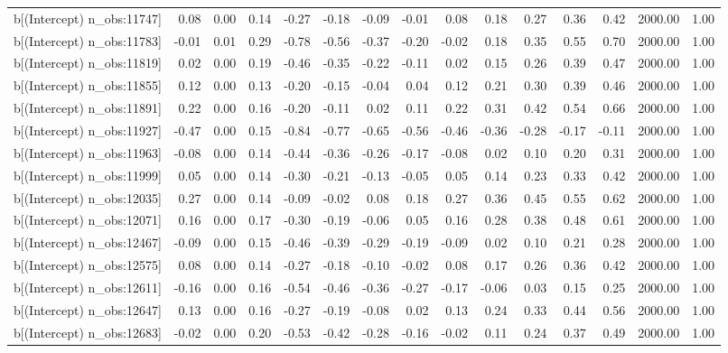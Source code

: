 \begin{table}[ht]
\begin{tabular}{rrrrrrrrrrrrrrr}
  b[(Intercept) n\_obs:11747] & 0.08 & 0.00 & 0.14 & -0.27 & -0.18 & -0.09 & -0.01 & 0.08 & 0.18 & 0.27 & 0.36 & 0.42 & 2000.00 & 1.00 \\ 
  b[(Intercept) n\_obs:11783] & -0.01 & 0.01 & 0.29 & -0.78 & -0.56 & -0.37 & -0.20 & -0.02 & 0.18 & 0.35 & 0.55 & 0.70 & 2000.00 & 1.00 \\ 
  b[(Intercept) n\_obs:11819] & 0.02 & 0.00 & 0.19 & -0.46 & -0.35 & -0.22 & -0.11 & 0.02 & 0.15 & 0.26 & 0.39 & 0.47 & 2000.00 & 1.00 \\ 
  b[(Intercept) n\_obs:11855] & 0.12 & 0.00 & 0.13 & -0.20 & -0.15 & -0.04 & 0.04 & 0.12 & 0.21 & 0.30 & 0.39 & 0.46 & 2000.00 & 1.00 \\ 
  b[(Intercept) n\_obs:11891] & 0.22 & 0.00 & 0.16 & -0.20 & -0.11 & 0.02 & 0.11 & 0.22 & 0.31 & 0.42 & 0.54 & 0.66 & 2000.00 & 1.00 \\ 
  b[(Intercept) n\_obs:11927] & -0.47 & 0.00 & 0.15 & -0.84 & -0.77 & -0.65 & -0.56 & -0.46 & -0.36 & -0.28 & -0.17 & -0.11 & 2000.00 & 1.00 \\ 
  b[(Intercept) n\_obs:11963] & -0.08 & 0.00 & 0.14 & -0.44 & -0.36 & -0.26 & -0.17 & -0.08 & 0.02 & 0.10 & 0.20 & 0.31 & 2000.00 & 1.00 \\ 
  b[(Intercept) n\_obs:11999] & 0.05 & 0.00 & 0.14 & -0.30 & -0.21 & -0.13 & -0.05 & 0.05 & 0.14 & 0.23 & 0.33 & 0.42 & 2000.00 & 1.00 \\ 
  b[(Intercept) n\_obs:12035] & 0.27 & 0.00 & 0.14 & -0.09 & -0.02 & 0.08 & 0.18 & 0.27 & 0.36 & 0.45 & 0.55 & 0.62 & 2000.00 & 1.00 \\ 
  b[(Intercept) n\_obs:12071] & 0.16 & 0.00 & 0.17 & -0.30 & -0.19 & -0.06 & 0.05 & 0.16 & 0.28 & 0.38 & 0.48 & 0.61 & 2000.00 & 1.00 \\ 
  b[(Intercept) n\_obs:12467] & -0.09 & 0.00 & 0.15 & -0.46 & -0.39 & -0.29 & -0.19 & -0.09 & 0.02 & 0.10 & 0.21 & 0.28 & 2000.00 & 1.00 \\ 
  b[(Intercept) n\_obs:12575] & 0.08 & 0.00 & 0.14 & -0.27 & -0.18 & -0.10 & -0.02 & 0.08 & 0.17 & 0.26 & 0.36 & 0.42 & 2000.00 & 1.00 \\ 
  b[(Intercept) n\_obs:12611] & -0.16 & 0.00 & 0.16 & -0.54 & -0.46 & -0.36 & -0.27 & -0.17 & -0.06 & 0.03 & 0.15 & 0.25 & 2000.00 & 1.00 \\ 
  b[(Intercept) n\_obs:12647] & 0.13 & 0.00 & 0.16 & -0.27 & -0.19 & -0.08 & 0.02 & 0.13 & 0.24 & 0.33 & 0.44 & 0.56 & 2000.00 & 1.00 \\ 
  b[(Intercept) n\_obs:12683] & -0.02 & 0.00 & 0.20 & -0.53 & -0.42 & -0.28 & -0.16 & -0.02 & 0.11 & 0.24 & 0.37 & 0.49 & 2000.00 & 1.00 \\ 

\end{tabular}
\end{table}
